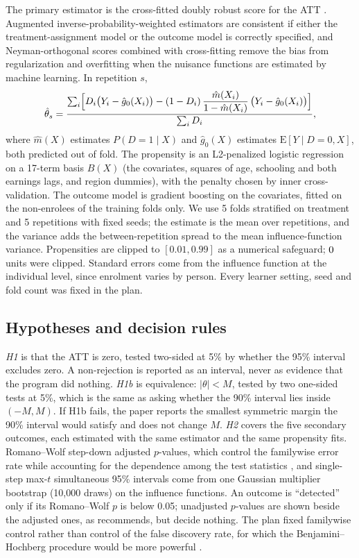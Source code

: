 \documentclass[11pt]{article}
\begin{document}
The primary estimator is the cross-fitted doubly robust score for the ATT
\citep{robins1994,bang2005,chernozhukov2018dml}. Augmented inverse-probability-weighted
estimators are consistent if either the treatment-assignment model or the outcome model is
correctly specified, and Neyman-orthogonal scores combined with cross-fitting remove the bias
from regularization and overfitting when the nuisance functions are estimated by machine
learning. In repetition $s$,
\[
\hat\theta_s
= \frac{\sum_i \Bigl[ D_i \bigl(Y_i - \hat g_0(X_i)\bigr)
  - (1 - D_i)\,\dfrac{\hat m(X_i)}{1 - \hat m(X_i)}\,\bigl(Y_i - \hat g_0(X_i)\bigr) \Bigr]}
  {\sum_i D_i},
\]
where $\hat m(X) $ estimates $P(D = 1 \mid X)$ and $\hat g_0(X)$ estimates
$\mathrm{E}[Y \mid D = 0, X]$, both predicted out of fold. The propensity is an
L2-penalized logistic regression on a 17-term basis $B(X)$ (the covariates, squares of age,
schooling and both earnings lags, and region dummies), with the penalty chosen by inner
cross-validation. The outcome model is gradient boosting on the covariates, fitted on the
non-enrolees of the training folds only. We use 5 folds stratified on treatment and 5
repetitions with fixed seeds; the estimate is the mean over repetitions, and the variance
adds the between-repetition spread to the mean influence-function variance. Propensities are
clipped to $[0.01, 0.99]$ as a numerical safeguard; $0$ units were clipped.
Standard errors come from the influence function at the individual level, since enrolment
varies by person. Every learner setting, seed and fold count was fixed in the plan.

\subsection{Hypotheses and decision rules}

\emph{H1} is that the ATT is zero, tested two-sided at 5\% by whether the 95\% interval
excludes zero. A non-rejection is reported as an interval, never as evidence that the
program did nothing. \emph{H1b} is equivalence: $|\theta| < M$, tested by two one-sided tests
at 5\%, which is the same as asking whether the 90\% interval lies inside $(-M, M)$. If H1b
fails, the paper reports the smallest symmetric margin the 90\% interval would satisfy and
does not change $M$. \emph{H2} covers the five secondary outcomes, each estimated with the
same estimator and the same propensity fits. Romano--Wolf step-down adjusted $p$-values,
which control the familywise error rate while accounting for the dependence among the test
statistics \citep{romano2005}, and single-step max-$t$ simultaneous 95\% intervals come from
one Gaussian multiplier bootstrap (10,000 draws) on the influence functions. An outcome is
``detected'' only if its Romano--Wolf $p$ is below 0.05; unadjusted $p$-values are shown
beside the adjusted ones, as \citet{anderson2008} recommends, but decide nothing. The plan fixed
familywise control rather than control of the false discovery rate, for which the
Benjamini--Hochberg procedure would be more powerful \citep{benjamini1995}.
\end{document}
